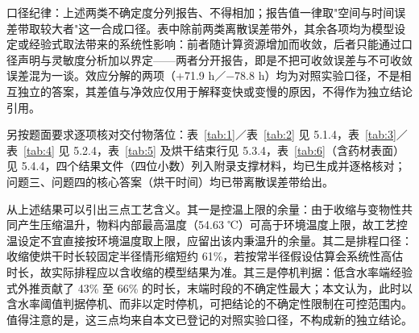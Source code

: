 口径纪律：上述两类不确定度分列报告、不得相加；报告值一律取"空间与时间误差带取较大者"这一合成口径。表中除前两类离散误差带外，其余各项均为模型设定或经验式取法带来的系统性影响：前者随计算资源增加而收敛，后者只能通过口径声明与灵敏度分析加以界定——两者分开报告，即是不把可收敛误差与不可收敛误差混为一谈。效应分解的两项（+71.9 h／−78.8 h）均为对照实验口径，不是相互独立的答案，其差值与净效应仅用于解释变快或变慢的原因，不得作为独立结论引用。

另按题面要求逐项核对交付物落位：表~\ref{tab:1}／表~\ref{tab:2} 见 5.1.4，表~\ref{tab:3}／表~\ref{tab:4} 见 5.2.4，表~\ref{tab:5} 及烘干结束行见 5.3.4，表~\ref{tab:6}（含药材表面）见 5.4.4，四个结果文件（四位小数）列入附录支撑材料，均已生成并逐格核对；问题三、问题四的核心答案（烘干时间）均已带离散误差带给出。

从上述结果可以引出三点工艺含义。其一是控温上限的余量：由于收缩与变物性共同产生压缩温升，物料内部最高温度（54.63 ℃）可高于环境温度上限，故工艺控温设定不宜直接按环境温度取上限，应留出该内秉温升的余量。其二是排程口径：收缩使烘干时长较固定半径情形缩短约 61\%，若按常半径假设估算会系统性高估时长，故实际排程应以含收缩的模型结果为准。其三是停机判据：低含水率端经验式外推贡献了 43\% 至 66\% 的时长，末端时段的不确定性最大；本文认为，此时以含水率阈值判据停机、而非以定时停机，可把结论的不确定性限制在可控范围内。值得注意的是，这三点均来自本文已登记的对照实验口径，不构成新的独立结论。
